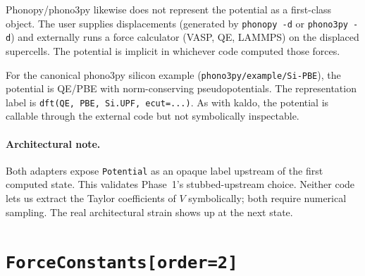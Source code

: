 \documentclass[11pt,a4paper]{article}
\begin{document}
\begin{phonobox}
Phonopy/phono3py likewise does not represent the potential as a first-class object. The user
supplies displacements (generated by \texttt{phonopy -d} or \texttt{phono3py -d}) and externally
runs a force calculator (VASP, QE, LAMMPS) on the displaced supercells. The potential is
implicit in whichever code computed those forces.

\medskip
For the canonical phono3py silicon example (\texttt{phono3py/example/Si-PBE}), the potential is
QE/PBE with norm-conserving pseudopotentials. The representation label is
\texttt{dft(QE, PBE, Si.UPF, ecut=...)}. As with kaldo, the potential is callable through the
external code but not symbolically inspectable.
\end{phonobox}

\paragraph{Architectural note.} Both adapters expose \texttt{Potential} as an opaque label
upstream of the first computed state. This validates Phase~1's stubbed-upstream choice. Neither
code lets us extract the Taylor coefficients of $V$ symbolically; both require numerical
sampling. The real architectural strain shows up at the next state.

\section{\texttt{ForceConstants[order=2]}}
\end{document}

